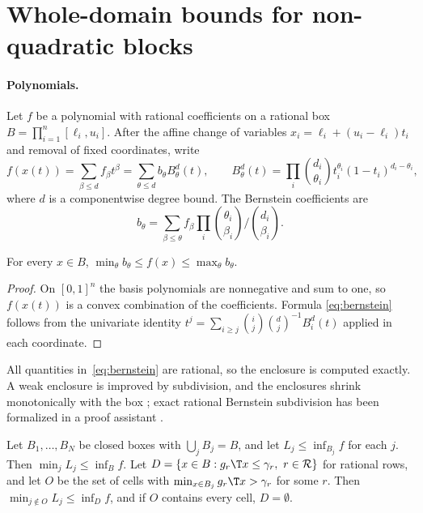 \section{Whole-domain bounds for non-quadratic blocks}\label{app:bounds}

\paragraph{Polynomials.}
Let $f$ be a polynomial with rational coefficients on a rational box
$B=\prod_{i=1}^n[\ell_i,u_i]$. After the affine change of variables
$x_i=\ell_i+(u_i-\ell_i)t_i$ and removal of fixed coordinates, write
\[
f(x(t))=\sum_{\beta\le d}f_\beta t^\beta=\sum_{\theta\le d}b_\theta B^d_\theta(t),
\qquad
B^d_\theta(t)=\prod_i\binom{d_i}{\theta_i}t_i^{\theta_i}(1-t_i)^{d_i-\theta_i},
\]
where $d$ is a componentwise degree bound. The Bernstein coefficients are
\begin{equation}\label{eq:bernstein}
b_\theta=\sum_{\beta\le\theta}f_\beta\prod_i\binom{\theta_i}{\beta_i}\Big/\binom{d_i}{\beta_i}.
\end{equation}

\begin{lemma}\label{lem:bernstein}
For every $x\in B$, $\min_\theta b_\theta\le f(x)\le\max_\theta b_\theta$.
\end{lemma}

\begin{proof}
On $[0,1]^n$ the basis polynomials are nonnegative and sum to one, so
$f(x(t))$ is a convex combination of the coefficients. Formula
\eqref{eq:bernstein} follows from the univariate identity
$t^j=\sum_{i\ge j}\binom ij\binom dj^{-1}B^d_i(t)$ applied in each coordinate.
\end{proof}

All quantities in~\eqref{eq:bernstein} are rational, so the enclosure is
computed exactly. A weak enclosure is improved by subdivision, and the
enclosures shrink monotonically with the box \citep{GarloffJanssonSmith2003};
exact rational Bernstein subdivision has been formalized in a proof assistant
\citep{MunozNarkawicz2013}.

\begin{proposition}\label{prop:partition}
Let $B_1,\dots,B_N$ be closed boxes with $\bigcup_jB_j=B$, and let
$L_j\le\inf_{B_j}f$ for each $j$. Then $\min_jL_j\le\inf_Bf$. Let
$D=\{x\in B:g_r\T x\le\gamma_r,\ r\in\mathcal R\}$ for rational rows, and let $O$
be the set of cells with $\min_{x\in B_j}g_r\T x>\gamma_r$ for some $r$. Then
$\min_{j\notin O}L_j\le\inf_Df$, and if $O$ contains every cell, $D=\emptyset$.
\end{proposition}

